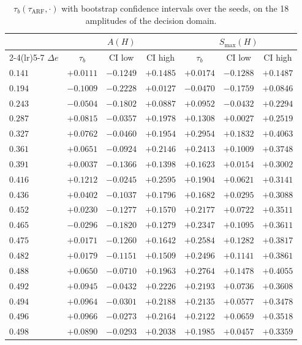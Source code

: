 \documentclass[11pt,a4paper]{article}
\begin{document}
\begin{table}[htbp]
  \centering
  \small
  \begin{tabular}{lcccccc}
    \toprule
    & \multicolumn{3}{c}{$A(H)$} & \multicolumn{3}{c}{$S_{\max}(H)$} \\
    \cmidrule(lr){2-4}\cmidrule(lr){5-7}
    $\Delta e$ & $\tau_b$ & CI low & CI high & $\tau_b$ & CI low & CI high \\
    \midrule
    $0.141$ & $+0.0111$ & $-0.1249$ & $+0.1485$ & $+0.0174$ & $-0.1288$ & $+0.1487$ \\
    $0.194$ & $-0.1009$ & $-0.2228$ & $+0.0127$ & $-0.0470$ & $-0.1759$ & $+0.0846$ \\
    $0.243$ & $-0.0504$ & $-0.1802$ & $+0.0887$ & $+0.0952$ & $-0.0432$ & $+0.2294$ \\
    $0.287$ & $+0.0815$ & $-0.0357$ & $+0.1978$ & $+0.1308$ & $+0.0027$ & $+0.2519$ \\
    $0.327$ & $+0.0762$ & $-0.0460$ & $+0.1954$ & $+0.2954$ & $+0.1832$ & $+0.4063$ \\
    $0.361$ & $+0.0651$ & $-0.0924$ & $+0.2146$ & $+0.2413$ & $+0.1009$ & $+0.3748$ \\
    $0.391$ & $+0.0037$ & $-0.1366$ & $+0.1398$ & $+0.1623$ & $+0.0154$ & $+0.3002$ \\
    $0.416$ & $+0.1212$ & $-0.0245$ & $+0.2595$ & $+0.1904$ & $+0.0621$ & $+0.3141$ \\
    $0.436$ & $+0.0402$ & $-0.1037$ & $+0.1796$ & $+0.1682$ & $+0.0295$ & $+0.3088$ \\
    $0.452$ & $+0.0230$ & $-0.1277$ & $+0.1570$ & $+0.2177$ & $+0.0722$ & $+0.3511$ \\
    $0.465$ & $-0.0296$ & $-0.1820$ & $+0.1279$ & $+0.2347$ & $+0.1095$ & $+0.3611$ \\
    $0.475$ & $+0.0171$ & $-0.1260$ & $+0.1642$ & $+0.2584$ & $+0.1282$ & $+0.3817$ \\
    $0.482$ & $+0.0179$ & $-0.1151$ & $+0.1509$ & $+0.2496$ & $+0.1141$ & $+0.3861$ \\
    $0.488$ & $+0.0650$ & $-0.0710$ & $+0.1963$ & $+0.2764$ & $+0.1478$ & $+0.4055$ \\
    $0.492$ & $+0.0945$ & $-0.0432$ & $+0.2226$ & $+0.2193$ & $+0.0736$ & $+0.3608$ \\
    $0.494$ & $+0.0964$ & $-0.0301$ & $+0.2188$ & $+0.2135$ & $+0.0577$ & $+0.3478$ \\
    $0.496$ & $+0.0966$ & $-0.0273$ & $+0.2164$ & $+0.2122$ & $+0.0659$ & $+0.3518$ \\
    $0.498$ & $+0.0890$ & $-0.0293$ & $+0.2038$ & $+0.1985$ & $+0.0457$ & $+0.3359$ \\
    \bottomrule
  \end{tabular}
  \caption{$\tau_b(\tau_{\mathrm{ARF}}, \cdot)$ with bootstrap confidence intervals over
  the seeds, on the 18 amplitudes of the decision domain.}
  \label{tab:strat}
\end{table}
\end{document}
